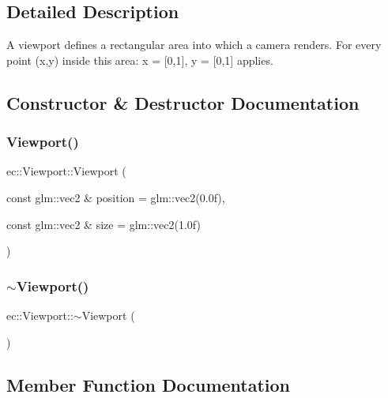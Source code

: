 \subsection{Detailed Description}
A viewport defines a rectangular area into which a camera renders. For every point (x,y) inside this area\+: x = \mbox{[}0,1\mbox{]}, y = \mbox{[}0,1\mbox{]} applies. 

\subsection{Constructor \& Destructor Documentation}
\mbox{\label{classec_1_1_viewport_a287d09d9303d9fbbea3c915f832d2ab8}} 
\subsubsection{\texorpdfstring{Viewport()}{Viewport()}}
{\footnotesize\ttfamily ec\+::\+Viewport\+::\+Viewport (\begin{DoxyParamCaption}\item[{const glm\+::vec2 \&}]{position = {\ttfamily glm\+:\+:vec2(0.0f)},  }\item[{const glm\+::vec2 \&}]{size = {\ttfamily glm\+:\+:vec2(1.0f)} }\end{DoxyParamCaption})\hspace{0.3cm}{\ttfamily [explicit]}}

\mbox{\label{classec_1_1_viewport_a65341c63372c6158a0a2932fa1f2c66b}} 
\subsubsection{\texorpdfstring{$\sim$\+Viewport()}{~Viewport()}}
{\footnotesize\ttfamily ec\+::\+Viewport\+::$\sim$\+Viewport (\begin{DoxyParamCaption}{ }\end{DoxyParamCaption})}



\subsection{Member Function Documentation}
\mbox{\label{classec_1_1_viewport_aee8a504b5b66702a627cc13aa3e4ac94}} 
